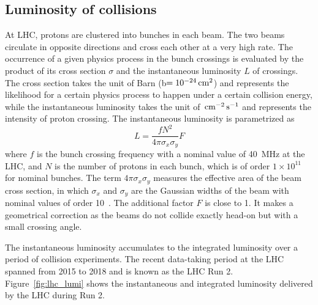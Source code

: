 \subsection{Luminosity of collisions}\label{sec:lumi}

At LHC, protons are clustered into bunches in each beam.
The two beams circulate in opposite directions and cross each other at a very high rate.
The occurrence of a given physics process in the bunch crossings is evaluated by the product of its cross section $\sigma$ and the instantaneous luminosity $L$ of crossings.
The cross section takes the unit of Barn (b$ = 10^{-24} \,\text{cm}^{2}$) and represents the likelihood for a certain physics process to happen under a certain collision energy,
while the instantaneous luminosity takes the unit of $\,\text{cm}^{-2}\,\text{s}^{-1}$ and represents the intensity of proton crossing.
The instantaneous luminosity is parametrized as 
\begin{equation}\label{eq:luminosity_def}
    L = \frac{fN^{2}}{4\pi\sigma_{x}\sigma_{y}} F
\end{equation}
where $f$ is the bunch crossing frequency with a nominal value of 40~MHz at the LHC,
and $N$ is the number of protons in each bunch, which is of order $1\times10^{11}$ for nominal bunches.
The term $4\pi\sigma_{x}\sigma_{y}$ measures the effective area of the beam cross section, 
in which $\sigma_{x}$ and $\sigma_{y}$ are the Gaussian widths of the beam with nominal values of order 10~\mum.
The additional factor $F$ is close to 1. 
It makes a geometrical correction as the beams do not collide exactly head-on but with a small crossing angle.

The instantaneous luminosity accumulates to the integrated luminosity over a period of collision experiments.
The recent data-taking period at the LHC spanned from 2015 to 2018 and is known as the LHC Run 2.
Figure~\ref{fig:lhc_lumi} shows the instantaneous and integrated luminosity delivered by the LHC during Run 2.

